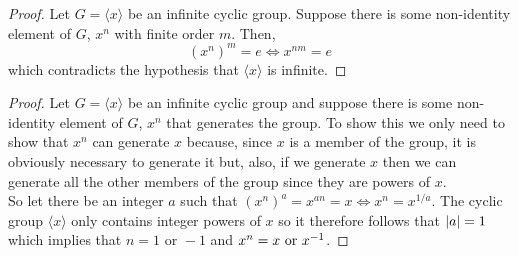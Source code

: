 \documentclass[MathsNotesBase.tex]{subfiles}
\begin{document}
{	
	\begin{proof}
		Let ${ G = \langle x \rangle }$ be an infinite cyclic group. Suppose there is some non-identity element of $G$, ${ x^n }$ with finite order $m$. Then,
		\[ (x^n)^m = e \iff x^{nm} = e \]
		which contradicts the hypothesis that ${ \langle x \rangle }$ is infinite.
	\end{proof}

	\begin{proof}
		Let ${ G = \langle x \rangle }$ be an infinite cyclic group and suppose there is some non-identity element of $G$, ${ x^n }$ that generates the group. To show this we only need to show that ${ x^n }$ can generate $x$ because, since $x$ is a member of the group, it is obviously necessary to generate it but, also, if we generate $x$ then we can generate all the other members of the group since they are powers of $x$.\\
		So let there be an integer $a$ such that ${ (x^n)^a = x^{an} = x \iff x^n = x^{1/a} }$. The cyclic group ${ \langle x \rangle }$ only contains integer powers of $x$ so it therefore follows that ${ \left\lvert a\right\rvert = 1 }$ which implies that ${ n = 1 \text{ or } -1 }$ and ${ x^n = x \text{ or } {x}^{-1} }$.
	\end{proof}

}
\end{document}
